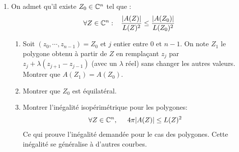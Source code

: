 \begin{enumerate}
\item On admet qu'il existe $Z_0\in \mathbb{C}^n$ tel que :
\begin{displaymath}
 \forall Z\in \mathbb{C}^n:\hspace{0.3cm}
\frac{|A(Z)|}{L(Z)^2} \leq \frac{|A(Z_0)|}{L(Z_0)^2}
\end{displaymath}
\begin{enumerate}
 \item Soit $(z_0, \cdots, z_{n-1})=Z_0$ et $j$ entier entre $0$ et $n-1$. On note $Z_1$ le polygone obtenu à partir de $Z$ en remplaçant $z_j$ par $z_j + \lambda(z_{j+1}-z_{j-1})$ (avec un $\lambda$ réel) sans changer les autres valeurs. Montrer que $A(Z_1)=A(Z_0)$.
 \item Montrer que $Z_0$ est équilatéral.
 \item Montrer l'inégalité isopérimétrique pour les polygones:
\begin{displaymath}
 \forall Z\in \mathbb{C}^n,\hspace{0.5cm} 4\pi |A(Z)|\leq L(Z)^2
\end{displaymath}
Ce qui prouve l'inégalité demandée pour le cas des polygones. Cette inégalité se généralise à d'autres courbes.
\end{enumerate}

\end{enumerate}
